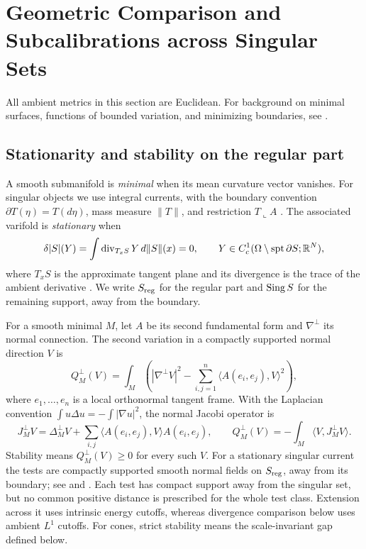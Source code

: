 \section[Geometric Comparison and Subcalibrations]{Geometric Comparison and Subcalibrations across Singular Sets}
\label{sec:preliminaries}

All ambient metrics in this section are Euclidean. For background on
minimal surfaces, functions of bounded variation, and minimizing
boundaries, see \cite{Giusti84}.

\subsection{Stationarity and stability on the regular part}
\label{sec:prelim-stability}

A smooth submanifold is \emph{minimal} when its mean curvature vector
vanishes. For singular objects we use integral currents, with the
boundary convention \(\partial T(\eta)=T(d\eta)\), mass measure
\(\|T\|\), and restriction \(T\llcorner A\) \cite{Federer69}.
The associated varifold is \emph{stationary} when
\begin{equation}\label{eq:stationarity-definition}
 \delta|S|(Y)=\int\operatorname{div}_{T_xS}Y\,d\|S\|(x)=0,
 \qquad Y\in C_c^1(\Omega\setminus\operatorname{spt}\partial S;\mathbb R^N),
\end{equation}
where \(T_xS\) is the approximate tangent plane and its divergence
is the trace of the ambient derivative
\cite[Section~16]{Simon83}.
We write \(S_{\mathrm{reg}}\) for the regular part
and \(\operatorname{Sing} S\) for the remaining support, away from the boundary.

For a smooth minimal \(M\), let \(A\) be its second fundamental form
and \(\nabla^\perp\) its normal connection.  The second variation in a
compactly supported normal direction \(V\) is
\begin{equation}\label{eq:normal-second-variation}
 Q_M^\perp(V)=\int_M\left(|\nabla^\perp V|^2
       -\sum_{i,j=1}^n\langle A(e_i,e_j),V\rangle^2\right),
\end{equation}
where \(e_1,\ldots,e_n\) is a local orthonormal tangent frame.
With the Laplacian convention \(\int u\Delta u=-\int|\nabla u|^2\),
the normal Jacobi operator is
\begin{equation}\label{eq:normal-Jacobi-definition}
 J_M^\perp V=\Delta_M^\perp V+
       \sum_{i,j}\langle A(e_i,e_j),V\rangle A(e_i,e_j),
 \qquad Q_M^\perp(V)=-\int_M\langle V,J_M^\perp V\rangle.
\end{equation}
Stability means \(Q_M^\perp(V)\geq0\) for every such \(V\).
For a stationary singular current the tests are compactly supported
smooth normal fields on \(S_{\mathrm{reg}}\), away from its boundary;
see \cite{Simons68} and
\cite[Lemma~9.7 and Remark~9.8]{Simon83}.
Each test has compact support away from the singular set, but no common
positive distance is prescribed for the whole test class.
Extension across it uses intrinsic energy cutoffs, whereas divergence
comparison below uses ambient \(L^1\) cutoffs. For cones, strict
stability means the scale-invariant gap defined below.

